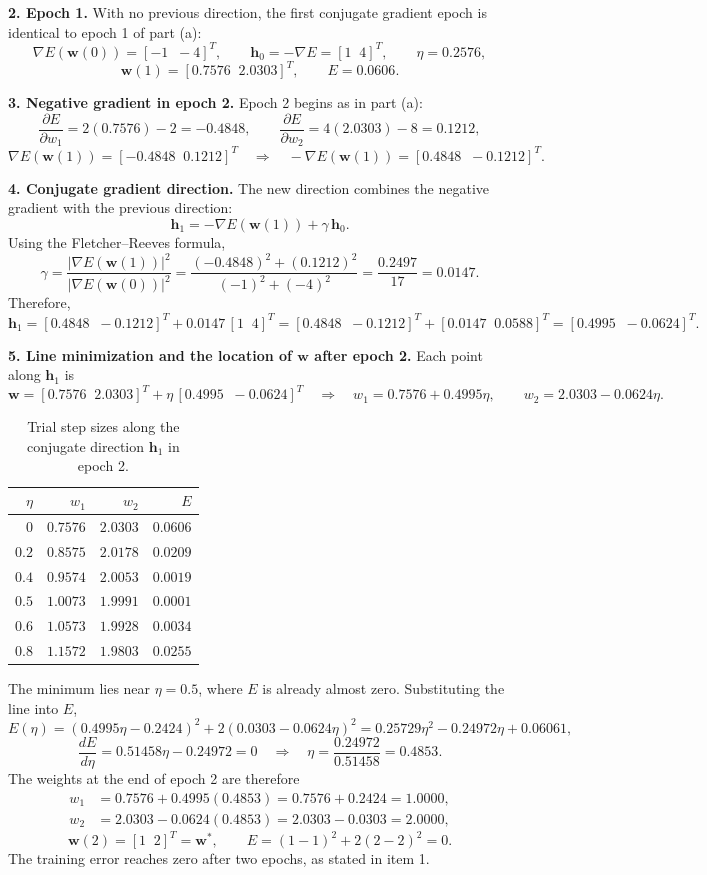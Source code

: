 \documentclass[11pt,letterpaper]{article}
\newcommand{\pd}[2]{\frac{\partial #1}{\partial #2}}
\begin{document}
\textbf{2. Epoch 1.} With no previous direction, the first conjugate gradient
epoch is identical to epoch 1 of part (a):
\[
\nabla E(\mathbf w(0))=[-1\;\;-4]^{T},\qquad
\mathbf h_0=-\nabla E=[1\;\;4]^{T},\qquad \eta=0.2576 ,
\]
\[
\mathbf w(1)=[0.7576\;\;2.0303]^{T},\qquad E=0.0606 .
\]

\textbf{3. Negative gradient in epoch 2.} Epoch 2 begins as in part (a):
\[
\pd{E}{w_1}=2(0.7576)-2=-0.4848,\qquad
\pd{E}{w_2}=4(2.0303)-8=0.1212 ,
\]
\[
\nabla E(\mathbf w(1))=[-0.4848\;\;0.1212]^{T}
\quad\Longrightarrow\quad
-\nabla E(\mathbf w(1))=[0.4848\;\;-0.1212]^{T}.
\]

\textbf{4. Conjugate gradient direction.} The new direction combines the
negative gradient with the previous direction:
\[
\mathbf h_1=-\nabla E(\mathbf w(1))+\gamma\,\mathbf h_0 .
\]
Using the Fletcher--Reeves formula,
\[
\gamma=\frac{\lvert\nabla E(\mathbf w(1))\rvert^2}{\lvert\nabla E(\mathbf w(0))\rvert^2}
=\frac{(-0.4848)^2+(0.1212)^2}{(-1)^2+(-4)^2}
=\frac{0.2497}{17}=0.0147 .
\]
Therefore,
\[
\mathbf h_1=[0.4848\;\;-0.1212]^{T}+0.0147\,[1\;\;4]^{T}
=[0.4848\;\;-0.1212]^{T}+[0.0147\;\;0.0588]^{T}
=[0.4995\;\;-0.0624]^{T}.
\]

\textbf{5. Line minimization and the location of $\mathbf w$ after epoch 2.}
Each point along $\mathbf h_1$ is
\[
\mathbf w=[0.7576\;\;2.0303]^{T}+\eta\,[0.4995\;\;-0.0624]^{T}
\quad\Longrightarrow\quad
w_1=0.7576+0.4995\eta,\qquad w_2=2.0303-0.0624\eta .
\]

\begin{table}[H]
\centering
\caption{Trial step sizes along the conjugate direction $\mathbf h_1$ in epoch 2.}
\renewcommand{\arraystretch}{1.2}
\begin{tabular}{rrrr}
\toprule
$\eta$ & $w_1$ & $w_2$ & $E$\\
\midrule
$0$   & $0.7576$ & $2.0303$ & $0.0606$\\
$0.2$ & $0.8575$ & $2.0178$ & $0.0209$\\
$0.4$ & $0.9574$ & $2.0053$ & $0.0019$\\
$\mathbf{0.5}$ & $\mathbf{1.0073}$ & $\mathbf{1.9991}$ & $\mathbf{0.0001}$\\
$0.6$ & $1.0573$ & $1.9928$ & $0.0034$\\
$0.8$ & $1.1572$ & $1.9803$ & $0.0255$\\
\bottomrule
\end{tabular}
\end{table}

The minimum lies near $\eta=0.5$, where $E$ is already almost zero.
Substituting the line into $E$,
\[
E(\eta)=(0.4995\eta-0.2424)^2+2(0.0303-0.0624\eta)^2
=0.25729\eta^2-0.24972\eta+0.06061 ,
\]
\[
\frac{dE}{d\eta}=0.51458\eta-0.24972=0
\quad\Longrightarrow\quad \eta=\frac{0.24972}{0.51458}=0.4853 .
\]
The weights at the end of epoch 2 are therefore
\begin{align*}
w_1&=0.7576+0.4995(0.4853)=0.7576+0.2424=1.0000,\\
w_2&=2.0303-0.0624(0.4853)=2.0303-0.0303=2.0000,
\end{align*}
\[
\boxed{\mathbf w(2)=[1\;\;2]^{T}=\mathbf w^*},\qquad
E=(1-1)^2+2(2-2)^2=0 .
\]
The training error reaches zero after two epochs, as stated in item 1.
\end{document}

